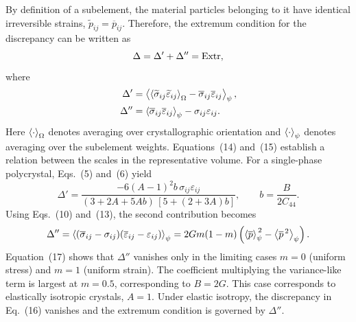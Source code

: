 By definition of a subelement, the material particles belonging to it have identical irreversible strains, $\widetilde p_{ij}=\overline p_{ij}$. Therefore, the extremum condition for the discrepancy can be written as
\begin{equation}
 \Delta=\Delta'+\Delta''=\Extr,
\end{equation}
where
\begin{equation}
\begin{aligned}
 \Delta'
 &=\avg[\psi]{\avg[\Omega]{\widetilde\sigma_{ij}\widetilde\varepsilon_{ij}}
                -\overline\sigma_{ij}\overline\varepsilon_{ij}},\\
 \Delta''
 &=\avg[\psi]{\overline\sigma_{ij}\overline\varepsilon_{ij}}
   -\sigma_{ij}\varepsilon_{ij}.
\end{aligned}
\end{equation}
Here $\avg[\Omega]{\cdot}$ denotes averaging over crystallographic orientation and $\avg[\psi]{\cdot}$ denotes averaging over the subelement weights. Equations~(14) and~(15) establish a relation between the scales in the representative volume. For a single-phase polycrystal, Eqs.~(5) and~(6) yield
\begin{equation}
 \Delta'
 =\frac{-6(A-1)^2b\,\sigma_{ij}\varepsilon_{ij}}
 {(3+2A+5Ab)\,[5+(2+3A)b]},
 \qquad
 b=\frac{B}{2C_{44}}.
\end{equation}
Using Eqs.~(10) and~(13), the second contribution becomes
\begin{equation}
 \Delta''
 =\avg[\psi]{(\overline\sigma_{ij}-\sigma_{ij})
              (\overline\varepsilon_{ij}-\varepsilon_{ij})}
 =2Gm(1-m)\left(\avg[\psi]{\overline p}^{\,2}
                         -\avg[\psi]{\overline p^{\,2}}\right).
\end{equation}
Equation~(17) shows that $\Delta''$ vanishes only in the limiting cases $m=0$ (uniform stress) and $m=1$ (uniform strain). The coefficient multiplying the variance-like term is largest at $m=0.5$, corresponding to $B=2G$. This case corresponds to elastically isotropic crystals, $A=1$. Under elastic isotropy, the discrepancy in Eq.~(16) vanishes and the extremum condition is governed by $\Delta''$.

